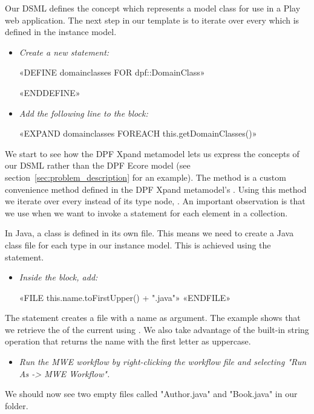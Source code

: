 Our DSML defines the concept  which represents a model class for use in a Play web application. The next step in our template is to iterate over every  which is defined in the instance model.
\begin{itemize}
  \item \emph{Create a new  statement:}
  \begin{plainlisting}
«DEFINE domainclasses FOR dpf::DomainClass»

«ENDDEFINE»
  \end{plainlisting}
  \item \emph{Add the following line to the   block:}
  \begin{plainlisting}
«EXPAND domainclasses FOREACH this.getDomainClasses()»
  \end{plainlisting}
\end{itemize}
We start to see how the DPF Xpand metamodel lets us express the concepts of our DSML rather than the DPF Ecore model (see section~\ref{sec:problem_description} for an example). The  method is a custom convenience method defined in the DPF Xpand metamodel's . Using this method we iterate over every  instead of its type node, . An important observation is that we use  when we want to invoke a  statement for each element in a collection.

In Java, a class is defined in its own file. This means we need to create a Java class file for each  type in our instance model. This is achieved using the  statement.
\begin{itemize}
  \item \emph{Inside the  block, add:}
\lstset{label=list:gencode,captionpos=b}
  \begin{plainlisting}
«FILE this.name.toFirstUpper() + ".java"»
«ENDFILE»
  \end{plainlisting}
\end{itemize}
The  statement creates a file with a name as argument. The example shows that we retrieve the  of the current  using . We also take advantage of the built-in string operation  that returns the name with the first letter as uppercase.

\begin{itemize}
  \item \emph{Run the MWE workflow by right-clicking the workflow file and selecting "Run As -> MWE Workflow".}
\end{itemize}
We should now see two empty files called "Author.java" and "Book.java" in our  folder.

